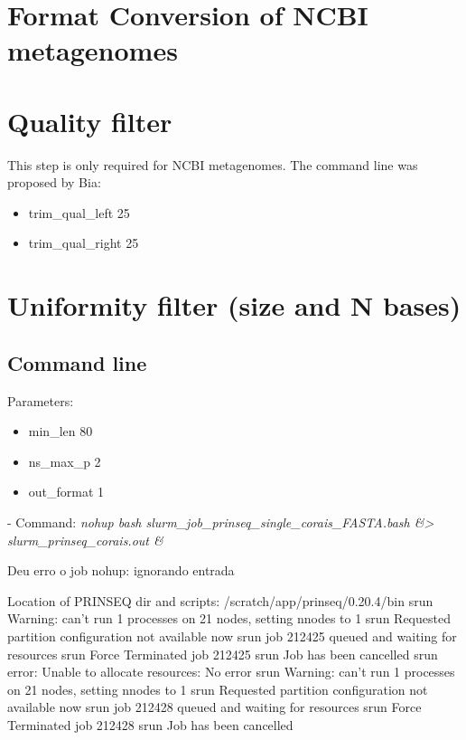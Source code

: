 \documentclass[12pt, a4paper]{report}
\begin{document}
\chapter{Format Conversion of NCBI metagenomes}
 
\chapter{Quality filter}
This step is only required for NCBI metagenomes. The command line was proposed by Bia:
\begin{itemize}
\item trim\_qual\_left 25
\item trim\_qual\_right 25
\end{itemize}


\chapter{Uniformity filter (size and N bases)}
\section{Command line}
Parameters:
\begin{itemize}
\item min\_len 80 
\item ns\_max\_p 2 
\item out\_format 1
\end{itemize}

\begin{tcolorbox}[width=6.3in]
 \scriptsize 
 - Command: \textit{nohup bash slurm\_job\_prinseq\_single\_corais\_FASTA.bash \&> slurm\_prinseq\_corais.out \&}
 \end{tcolorbox}

Deu erro o job\:
nohup: ignorando entrada

\begin{tcolorbox}[width=6.3in]
 \scriptsize 
Location of PRINSEQ dir and scripts: /scratch/app/prinseq/0.20.4/bin
srun\: Warning: can't run 1 processes on 21 nodes, setting nnodes to 1
srun\: Requested partition configuration not available now
srun\: job 212425 queued and waiting for resources
srun\: Force Terminated job 212425
srun\: Job has been cancelled
srun\: error: Unable to allocate resources: No error
srun\: Warning: can't run 1 processes on 21 nodes, setting nnodes to 1
srun\: Requested partition configuration not available now
srun\: job 212428 queued and waiting for resources
srun\: Force Terminated job 212428
srun\: Job has been cancelled
\end{tcolorbox}
\end{document}
